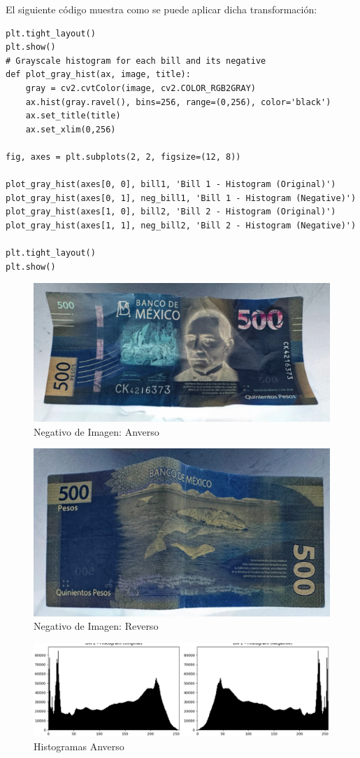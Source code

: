 \documentclass[12pt,letterpaper]{article}
\begin{document}
El siguiente código muestra como se puede aplicar dicha transformación:

\begin{verbatim}
plt.tight_layout()
plt.show()
# Grayscale histogram for each bill and its negative
def plot_gray_hist(ax, image, title):
    gray = cv2.cvtColor(image, cv2.COLOR_RGB2GRAY)
    ax.hist(gray.ravel(), bins=256, range=(0,256), color='black')
    ax.set_title(title)
    ax.set_xlim(0,256)

fig, axes = plt.subplots(2, 2, figsize=(12, 8))

plot_gray_hist(axes[0, 0], bill1, 'Bill 1 - Histogram (Original)')
plot_gray_hist(axes[0, 1], neg_bill1, 'Bill 1 - Histogram (Negative)')
plot_gray_hist(axes[1, 0], bill2, 'Bill 2 - Histogram (Original)')
plot_gray_hist(axes[1, 1], neg_bill2, 'Bill 2 - Histogram (Negative)')

plt.tight_layout()
plt.show()
\end{verbatim}

\begin{figure}[H]
  \centering
  \includegraphics[width=0.5\linewidth]{figuras/negativo1.png}
  \caption{Negativo de Imagen: Anverso}
  \label{fig:billete_negativo_1}
\end{figure}

\begin{figure}[H]
  \centering
  \includegraphics[width=0.5\linewidth]{figuras/negativo2.png}
  \caption{Negativo de Imagen: Reverso}
  \label{fig:billete_negativo_2}
\end{figure}

\begin{figure}[H]
  \centering
  \includegraphics[width=0.5\linewidth]{figuras/histograma_negativo1.png}
  \caption{Histogramas Anverso}
  \label{fig:histograma_negativo1}
\end{figure}
\end{document}
